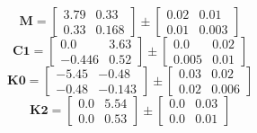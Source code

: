 \documentclass[../../report/parameterReport.tex]{subfiles}
\begin{document}
\begin{equation}
\mathbf{M}=
\left[
\begin{array}{rr}
    3.79 & 0.33\\
    0.33 & 0.168
\end{array}
\right]
\pm
\left[
\begin{array}{rr}
    0.02 & 0.01\\
    0.01 & 0.003
\end{array}
\right]
\label{eq:M}
\end{equation}
\begin{equation}
\mathbf{C1}=
\left[
\begin{array}{rr}
    0.0 & 3.63\\
    -0.446 & 0.52
\end{array}
\right]
\pm
\left[
\begin{array}{rr}
    0.0 & 0.02\\
    0.005 & 0.01
\end{array}
\right]
\label{eq:C1}
\end{equation}
\begin{equation}
\mathbf{K0}=
\left[
\begin{array}{rr}
    -5.45 & -0.48\\
    -0.48 & -0.143
\end{array}
\right]
\pm
\left[
\begin{array}{rr}
    0.03 & 0.02\\
    0.02 & 0.006
\end{array}
\right]
\label{eq:K0}
\end{equation}
\begin{equation}
\mathbf{K2}=
\left[
\begin{array}{rr}
    0.0 & 5.54\\
    0.0 & 0.53
\end{array}
\right]
\pm
\left[
\begin{array}{rr}
    0.0 & 0.03\\
    0.0 & 0.01
\end{array}
\right]
\label{eq:K2}
\end{equation}
\end{document}
